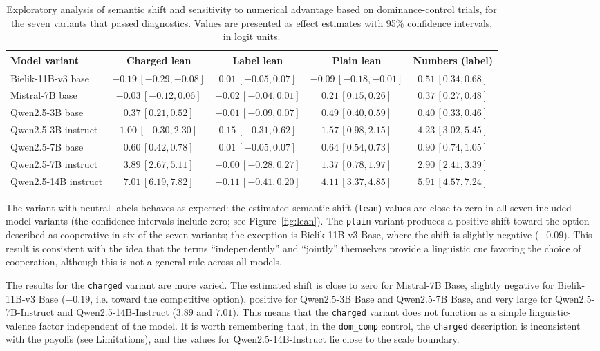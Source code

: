 \documentclass[11pt]{article}
\begin{document}
\begin{table}[H]
\centering
\scriptsize
\caption{Exploratory analysis of semantic shift and sensitivity to numerical advantage based on dominance-control trials, for the seven variants that passed diagnostics. Values are presented as effect estimates with 95\% confidence intervals, in logit units.}
\begin{tabular}{lcccc}
\toprule
Model variant & Charged lean & Label lean & Plain lean & Numbers (label) \\
\midrule
Bielik-11B-v3 base & $-0.19\,[-0.29,-0.08]$ & $0.01\,[-0.05,0.07]$ & $-0.09\,[-0.18,-0.01]$ & $0.51\,[0.34,0.68]$ \\
Mistral-7B base & $-0.03\,[-0.12,0.06]$ & $-0.02\,[-0.04,0.01]$ & $0.21\,[0.15,0.26]$ & $0.37\,[0.27,0.48]$ \\
Qwen2.5-3B base & $0.37\,[0.21,0.52]$ & $-0.01\,[-0.09,0.07]$ & $0.49\,[0.40,0.59]$ & $0.40\,[0.33,0.46]$ \\
Qwen2.5-3B instruct & $1.00\,[-0.30,2.30]$ & $0.15\,[-0.31,0.62]$ & $1.57\,[0.98,2.15]$ & $4.23\,[3.02,5.45]$ \\
Qwen2.5-7B base & $0.60\,[0.42,0.78]$ & $0.01\,[-0.05,0.07]$ & $0.64\,[0.54,0.73]$ & $0.90\,[0.74,1.05]$ \\
Qwen2.5-7B instruct & $3.89\,[2.67,5.11]$ & $-0.00\,[-0.28,0.27]$ & $1.37\,[0.78,1.97]$ & $2.90\,[2.41,3.39]$ \\
Qwen2.5-14B instruct & $7.01\,[6.19,7.82]$ & $-0.11\,[-0.41,0.20]$ & $4.11\,[3.37,4.85]$ & $5.91\,[4.57,7.24]$ \\
\bottomrule
\end{tabular}
\label{tab:lean}
\end{table}

The variant with neutral labels behaves as expected: the estimated semantic-shift (\texttt{lean}) values are close to zero in all seven included model variants (the confidence intervals include zero; see Figure~\ref{fig:lean}). The \texttt{plain} variant produces a positive shift toward the option described as cooperative in six of the seven variants; the exception is Bielik-11B-v3 Base, where the shift is slightly negative ($-0.09$). This result is consistent with the idea that the terms “independently” and “jointly” themselves provide a linguistic cue favoring the choice of cooperation, although this is not a general rule across all models.

The results for the \texttt{charged} variant are more varied. The estimated shift is close to zero for Mistral-7B Base, slightly negative for Bielik-11B-v3 Base ($-0.19$, i.e. toward the competitive option), positive for Qwen2.5-3B Base and Qwen2.5-7B Base, and very large for Qwen2.5-7B-Instruct and Qwen2.5-14B-Instruct ($3.89$ and $7.01$). This means that the \texttt{charged} variant does not function as a simple linguistic-valence factor independent of the model. It is worth remembering that, in the \texttt{dom\_comp} control, the \texttt{charged} description is inconsistent with the payoffs (see Limitations), and the values for Qwen2.5-14B-Instruct lie close to the scale boundary.
\end{document}
